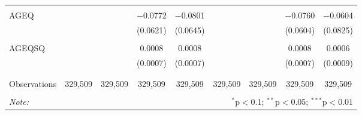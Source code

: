\begin{table}[!htbp]
\begin{tabular}{@{\extracolsep{5pt}}lcccccccc}
  & & & & & & & & \\ 
 AGEQ &  &  & $-$0.0772 & $-$0.0801 &  &  & $-$0.0760 & $-$0.0604 \\ 
  &  &  & (0.0621) & (0.0645) &  &  & (0.0604) & (0.0825) \\ 
  & & & & & & & & \\ 
 AGEQSQ &  &  & 0.0008 & 0.0008 &  &  & 0.0008 & 0.0006 \\ 
  &  &  & (0.0007) & (0.0007) &  &  & (0.0007) & (0.0009) \\ 
  & & & & & & & & \\ 
\hline \\[-1.8ex] 
Observations & 329,509 & 329,509 & 329,509 & 329,509 & 329,509 & 329,509 & 329,509 & 329,509 \\ 
\hline 
\hline \\[-1.8ex] 
\textit{Note:}  & \multicolumn{8}{r}{$^{*}$p$<$0.1; $^{**}$p$<$0.05; $^{***}$p$<$0.01} \\ 
\end{tabular} 
\end{table} 
